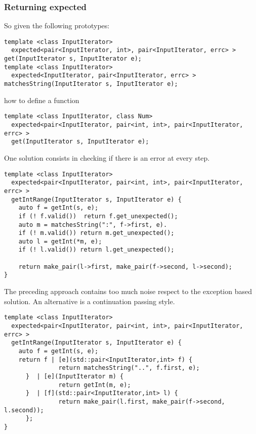 \documentclass[a4paper,10pt]{article}
\begin{document}
\subsubsection{Returning expected}

So given the following prototypes:

\begin{lstlisting}
template <class InputIterator>
  expected<pair<InputIterator, int>, pair<InputIterator, errc> > get(InputIterator s, InputIterator e);
template <class InputIterator>
  expected<InputIterator, pair<InputIterator, errc> > matchesString(InputIterator s, InputIterator e);
\end{lstlisting}

\noindent
how to define a function

\begin{lstlisting}
template <class InputIterator, class Num>
  expected<pair<InputIterator, pair<int, int>, pair<InputIterator, errc> > 
  get(InputIterator s, InputIterator e);
\end{lstlisting}

One solution consists in checking if there is an error at every step. 

\begin{lstlisting}
template <class InputIterator>
  expected<pair<InputIterator, pair<int, int>, pair<InputIterator, errc> > 
  getIntRange(InputIterator s, InputIterator e) {
    auto f = getInt(s, e);
    if (! f.valid())  return f.get_unexpected();
    auto m = matchesString(":", f->first, e).
    if (! m.valid()) return m.get_unexpected();
    auto l = getInt(*m, e);
    if (! l.valid()) return l.get_unexpected();
        
    return make_pair(l->first, make_pair(f->second, l->second);
}
\end{lstlisting}

The preceding approach contains too much noise respect to the exception based solution. An alternative is a continuation passing style. 

\begin{lstlisting}
template <class InputIterator>
  expected<pair<InputIterator, pair<int, int>, pair<InputIterator, errc> > 
  getIntRange(InputIterator s, InputIterator e) {
    auto f = getInt(s, e);
    return f | [e](std::pair<InputIterator,int> f) {
    	       return matchesString("..", f.first, e); 
	  }  | [e](InputIterator m) {
               return getInt(m, e); 
	  }  | [f](std::pair<InputIterator,int> l) {
               return make_pair(l.first, make_pair(f->second, l.second)); 
	  };
}
\end{lstlisting}
\end{document}

